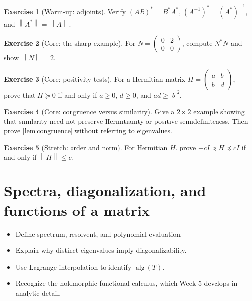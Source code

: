 \documentclass[11pt,oneside,openany]{book}
\theoremstyle{definition}
\newtheorem{exercise}{Exercise}[chapter]
\theoremstyle{remark}
\newcommand{\alg}{\operatorname{alg}}
\newcommand{\norm}[1]{\left\lVert #1\right\rVert}
\begin{document}
\begin{exercise}[Warm-up: adjoints]
Verify \((AB)^*=B^*A^*\), \((A^{-1})^*=(A^*)^{-1}\), and
\(\norm{A^*}=\norm{A}\).
\end{exercise}

\begin{exercise}[Core: the sharp example]
\label{ex:norm-N}
For \(N=\begin{pmatrix}0&2\\0&0\end{pmatrix}\), compute \(N^*N\) and
show \(\norm{N}=2\).
\end{exercise}

\begin{exercise}[Core: positivity tests]
\label{ex:psd-tests}
For a Hermitian matrix
\(
H=\begin{pmatrix}a&b\\\overline b&d\end{pmatrix},
\)
prove that \(H\succeq0\) if and only if
\(a\geq0\), \(d\geq0\), and \(ad\geq|b|^2\).
\end{exercise}

\begin{exercise}[Core: congruence versus similarity]
\label{ex:congruence}
Give a \(2\times2\) example showing that similarity need not preserve
Hermitianity or positive semidefiniteness.  Then prove
\cref{lem:congruence} without referring to eigenvalues.
\end{exercise}

\begin{exercise}[Stretch: order and norm]
For Hermitian \(H\), prove
\(-cI\preceq H\preceq cI\) if and only if \(\norm{H}\leq c\).
\end{exercise}

\chapter{Spectra, diagonalization, and functions of a matrix}
\label{ch:functional-calculus}

\begin{learninggoals}
\begin{itemize}
  \item Define spectrum, resolvent, and polynomial evaluation.
  \item Explain why distinct eigenvalues imply diagonalizability.
  \item Use Lagrange interpolation to identify \(\alg(T)\).
  \item Recognize the holomorphic functional calculus, which Week 5
  develops in analytic detail.
\end{itemize}
\end{learninggoals}
\end{document}
